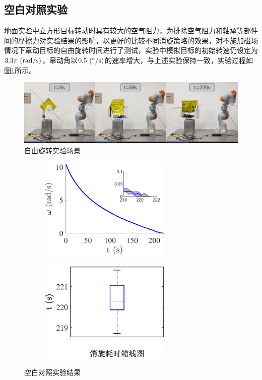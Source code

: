 \documentclass[lang=chs, degree=master, blindreview=false, winfonts=true]{yanputhesis}
\begin{document}
\subsection{空白对照实验}
地面实验中立方形目标转动时具有较大的空气阻力，为排除空气阻力和轴承等部件间的摩擦力对实验结果的影响，以更好的比较不同消旋策略的效果，对不施加磁场情况下章动目标的自由旋转时间进行了测试，实验中模拟目标的初始转速仍设定为$3.3\pi\ \rm{(rad/s)}$，章动角以$0.5\ \rm{(^\circ/s)}$的速率增大，与上述实验保持一致，实验过程如图\ref{fig:freerota_exp}所示。
\begin{figure}[htb]
	\centering
	\includegraphics[width = 5.4in]{picture/freerota_exp.png}
	\caption{自由旋转实验场景}
	\label{fig:freerota_exp}
\end{figure}

\begin{figure}[htb!]
	\centering
	\begin{minipage}[t]{0.96\textwidth}
		\begin{subfigure}[t]{0.47\textwidth}
			\centering
			\includegraphics[width = 2.5in]{picture/free_errbar.eps}
			\caption{ }
			\label{fig:free_errbar}
		\end{subfigure}\hfill
		\begin{subfigure}[t]{0.47\textwidth}
			\centering
			\includegraphics[width = 2.5in]{picture/free_boxline.eps}
			\caption{ }
			\label{free_boxline}
		\end{subfigure}
	\end{minipage}
	\caption{空白对照实验结果\label{Fig.free_result}}
\end{figure}
\end{document}
